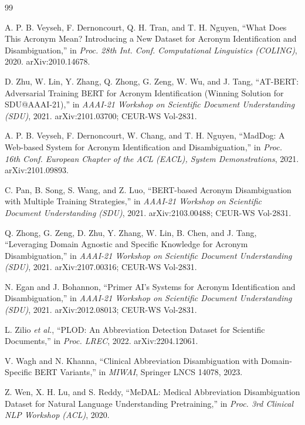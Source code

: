 \documentclass[10pt,conference]{IEEEtran}
\begin{document}
\balance
\begin{thebibliography}{99}

 A. P. B. Veyseh, F. Dernoncourt, Q. H. Tran, and T. H. Nguyen, ``What Does This Acronym Mean? Introducing a New Dataset for Acronym Identification and Disambiguation,'' in \emph{Proc. 28th Int. Conf. Computational Linguistics (COLING)}, 2020. arXiv:2010.14678.

 D. Zhu, W. Lin, Y. Zhang, Q. Zhong, G. Zeng, W. Wu, and J. Tang, ``AT-BERT: Adversarial Training BERT for Acronym Identification (Winning Solution for SDU@AAAI-21),'' in \emph{AAAI-21 Workshop on Scientific Document Understanding (SDU)}, 2021. arXiv:2101.03700; CEUR-WS Vol-2831.

 A. P. B. Veyseh, F. Dernoncourt, W. Chang, and T. H. Nguyen, ``MadDog: A Web-based System for Acronym Identification and Disambiguation,'' in \emph{Proc. 16th Conf. European Chapter of the ACL (EACL), System Demonstrations}, 2021. arXiv:2101.09893.

 C. Pan, B. Song, S. Wang, and Z. Luo, ``BERT-based Acronym Disambiguation with Multiple Training Strategies,'' in \emph{AAAI-21 Workshop on Scientific Document Understanding (SDU)}, 2021. arXiv:2103.00488; CEUR-WS Vol-2831.

 Q. Zhong, G. Zeng, D. Zhu, Y. Zhang, W. Lin, B. Chen, and J. Tang, ``Leveraging Domain Agnostic and Specific Knowledge for Acronym Disambiguation,'' in \emph{AAAI-21 Workshop on Scientific Document Understanding (SDU)}, 2021. arXiv:2107.00316; CEUR-WS Vol-2831.

 N. Egan and J. Bohannon, ``Primer AI's Systems for Acronym Identification and Disambiguation,'' in \emph{AAAI-21 Workshop on Scientific Document Understanding (SDU)}, 2021. arXiv:2012.08013; CEUR-WS Vol-2831.

 L. Zilio \emph{et al.}, ``PLOD: An Abbreviation Detection Dataset for Scientific Documents,'' in \emph{Proc. LREC}, 2022. arXiv:2204.12061.

 V. Wagh and N. Khanna, ``Clinical Abbreviation Disambiguation with Domain-Specific BERT Variants,'' in \emph{MIWAI}, Springer LNCS 14078, 2023.

 Z. Wen, X. H. Lu, and S. Reddy, ``MeDAL: Medical Abbreviation Disambiguation Dataset for Natural Language Understanding Pretraining,'' in \emph{Proc. 3rd Clinical NLP Workshop (ACL)}, 2020.


\end{thebibliography}
\end{document}
